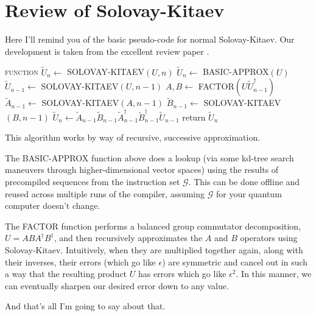 \section{Review of Solovay-Kitaev}

Here I'll remind you of the basic pseudo-code for normal Solovay-Kitaev.
Our development is taken from the excellent review paper \cite{Dawson2005}.

\begin{algorithmic}[1]
\STATE \textsc{function} $\tilde{U}_n \leftarrow$ SOLOVAY-KITAEV$(U,n)$
\STATE $\tilde{U}_n \leftarrow $ BASIC-APPROX$(U)$
\ELSE
\STATE $\tilde{U}_{n-1} \leftarrow$ SOLOVAY-KITAEV$(U, n-1)$
\STATE $A,B \leftarrow $ FACTOR$(U\tilde{U}^\dagger_{n-1})$
\STATE $\tilde{A}_{n-1} \leftarrow $ SOLOVAY-KITAEV$(A, n-1)$
\STATE $\tilde{B}_{n-1} \leftarrow $ SOLOVAY-KITAEV$(B, n-1)$
\STATE $\tilde{U}_n \leftarrow \tilde{A}_{n-1}\tilde{B}_{n-1}\tilde{A}^\dagger_{n-1}\tilde{B}^\dagger_{n-1}\tilde{U}_{n-1}$
\ENDIF
return $\tilde{U}_n$
\end{algorithmic}

This algorithm works by way of recursive, successive approximation.

The BASIC-APPROX function above does a lookup (via some kd-tree search
maneuvers through higher-dimensional vector spaces) using the results of
precompiled sequences from the instruction set $\mathcal{G}$. This can be
done offline and reused across multiple runs of the compiler, assuming
$\mathcal{G}$ for your quantum computer doesn't change.

The FACTOR function performs a balanced group commutator decomposition,
$U = ABA^\dagger B^\dagger$, and then recursively approximates the $A$ and $B$
operators using Solovay-Kitaev. Intuitively, when they are multiplied
together again, along with their inverses, their errors (which go like
$\epsilon$) are symmetric and cancel out in such a way that the resulting
product $U$ has errors which go like $\epsilon^2$. In this manner, we can
eventually sharpen our desired error down to any value.

And that's all I'm going to say about that.

